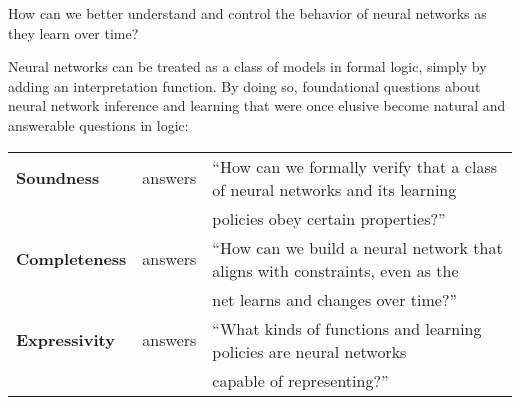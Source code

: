 \documentclass[letterpaper]{article}
\begin{document}
\begin{question}
How can we better understand and control the behavior of neural networks as they learn over time?
\end{question}

\begin{thesis}
Neural networks can be treated as a class of models in formal logic, simply by adding an interpretation function.  By doing so, foundational questions about neural network inference and learning that were once elusive become natural and answerable questions in logic:

\begin{tabular}{lcl}
    \textbf{Soundness} & answers & ``How can we formally verify that a class of neural networks and its learning\\
    & & \quad policies obey certain properties?''\\
    \textbf{Completeness} & answers & ``How can we build a neural network that aligns with constraints, even as the\\
    & & \quad net learns and changes over time?''\\
    \textbf{Expressivity} & answers & ``What kinds of functions and learning policies are neural networks\\
    & & \quad capable of representing?''\\
\end{tabular}
\end{thesis}
\end{document}
